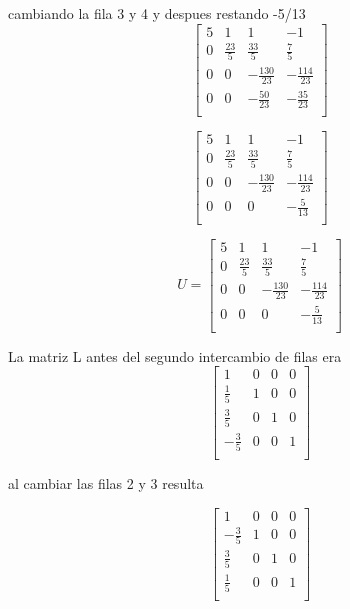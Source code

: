 \documentclass{article}
\begin{document}
cambiando la fila 3 y 4 y despues restando -5/13
\[
    \begin{bmatrix}
        5 & 1 & 1 & -1   \\
        0 & \frac{23}{5} & \frac{33}{5} & \frac{7}{5}   \\
        0 & 0  & -\frac{130}{23} & -\frac{114}{23}   \\
        0 & 0 & -\frac{50}{23} & -\frac{35}{23}   \\
    \end{bmatrix}
\]

\[
    \begin{bmatrix}
        5 & 1 & 1 & -1   \\
        0 & \frac{23}{5} & \frac{33}{5} & \frac{7}{5}   \\
        0 & 0  & -\frac{130}{23} & -\frac{114}{23}   \\
        0 & 0 & 0 & -\frac{5}{13}   \\
    \end{bmatrix}
\]

\[
U =
\begin{bmatrix}
        5 & 1 & 1 & -1   \\
        0 & \frac{23}{5} & \frac{33}{5} & \frac{7}{5}   \\
        0 & 0  & -\frac{130}{23} & -\frac{114}{23}   \\
        0 & 0 & 0 & -\frac{5}{13}   \\
    \end{bmatrix}
\]


La matriz L antes del segundo intercambio de filas era
\[
\begin{bmatrix}
        1 & 0 & 0 & 0   \\
        \frac{1}{5} & 1 & 0 & 0   \\
        \frac{3}{5} & 0  & 1 & 0   \\
        -\frac{3}{5} & 0 & 0 & 1   \\
    \end{bmatrix}
\]

al cambiar las filas 2 y 3 resulta

\[
\begin{bmatrix}
        1 & 0 & 0 & 0   \\
        -\frac{3}{5} & 1 & 0 & 0   \\
        \frac{3}{5} & 0  & 1 & 0   \\
        \frac{1}{5} & 0 & 0 & 1  \\
    \end{bmatrix}
\]
\end{document}
